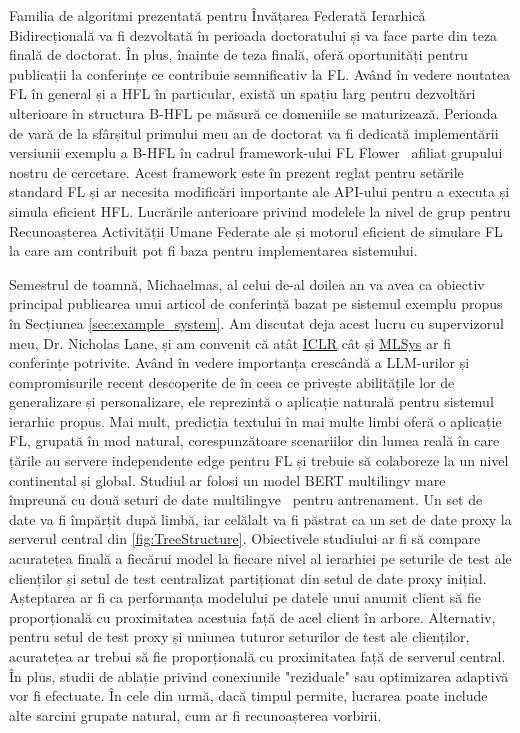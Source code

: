 Familia de algoritmi prezentată pentru Învățarea Federată Ierarhică Bidirecțională va fi dezvoltată în perioada doctoratului și va face parte din teza finală de doctorat. În plus, înainte de teza finală, oferă oportunități pentru publicații la conferințe ce contribuie semnificativ la FL. Având în vedere noutatea FL în general și a HFL în particular, există un spațiu larg pentru dezvoltări ulterioare în structura B-HFL pe măsură ce domeniile se maturizează. Perioada de vară de la sfârșitul primului meu an de doctorat va fi dedicată implementării versiunii exemplu a B-HFL în cadrul framework-ului FL Flower~\citep{Flower} afiliat grupului nostru de cercetare. Acest framework este în prezent reglat pentru setările standard FL și ar necesita modificări importante ale API-ului pentru a executa și simula eficient HFL\@. Lucrările anterioare privind modelele la nivel de grup pentru Recunoașterea Activității Umane Federate ale \citet{OperaWorkshop} și motorul eficient de simulare FL la care am contribuit pot fi baza pentru implementarea sistemului.

Semestrul de toamnă, Michaelmas, al celui de-al doilea an va avea ca obiectiv principal publicarea unui articol de conferință bazat pe sistemul exemplu propus în Secțiunea \ref{sec:example_system}. Am discutat deja acest lucru cu supervizorul meu, Dr. Nicholas Lane, și am convenit că atât \href{https://iclr.cc/}{ICLR} cât și \href{https://mlsys.org/}{MLSys} ar fi conferințe potrivite. Având în vedere importanța crescândă a LLM-urilor și compromisurile recent descoperite de \citet{PersonalisationGeneralisationTradeoff} în ceea ce privește abilitățile lor de generalizare și personalizare, ele reprezintă o aplicație naturală pentru sistemul ierarhic propus. Mai mult, predicția textului în mai multe limbi oferă o aplicație FL, grupată în mod natural, corespunzătoare scenariilor din lumea reală în care țările au servere independente edge pentru FL și trebuie să colaboreze la un nivel continental și global. Studiul ar folosi un model BERT multilingv mare~\citep{RoBERTA} împreună cu două seturi de date multilingve~\citep[e.g., ][]{XGLUE,mC4} pentru antrenament. Un set de date va fi împărțit după limbă, iar celălalt va fi păstrat ca un set de date proxy la serverul central din \cref{fig:TreeStructure}. Obiectivele studiului ar fi să compare acuratețea finală a fiecărui model la fiecare nivel al ierarhiei pe seturile de test ale clienților și setul de test centralizat partiționat din setul de date proxy inițial. Așteptarea ar fi ca performanța modelului pe datele unui anumit client să fie proporțională cu proximitatea acestuia față de acel client în arbore. Alternativ, pentru setul de test proxy și uniunea tuturor seturilor de test ale clienților, acuratețea ar trebui să fie proporțională cu proximitatea față de serverul central. În plus, studii de ablație privind conexiunile "reziduale" sau optimizarea adaptivă vor fi efectuate. În cele din urmă, dacă timpul permite, lucrarea poate include alte sarcini grupate natural, cum ar fi recunoașterea vorbirii.

